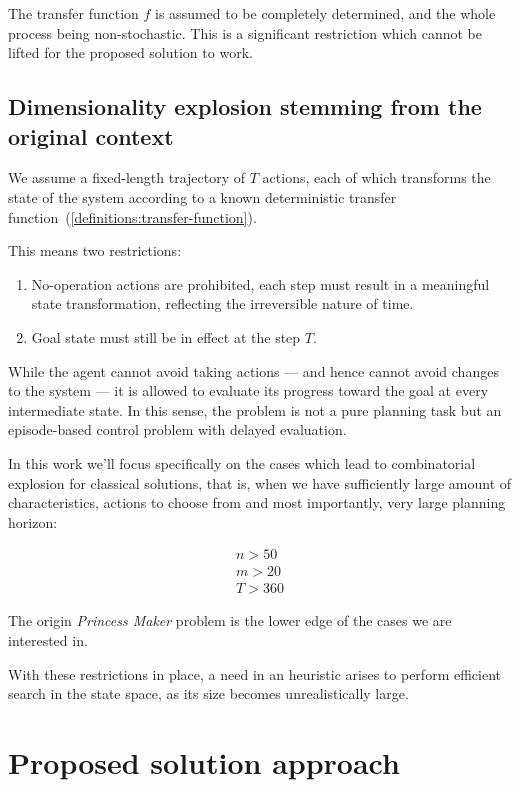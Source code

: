 \documentclass[12pt, a4paper]{article}
\begin{document}
	The transfer function $f$ is assumed to be completely determined, and the whole process being non-stochastic. This is a significant restriction which cannot be lifted for the proposed solution to work.

	\subsection{Dimensionality explosion stemming from the original context}

	We assume a fixed-length trajectory of $𝑇$ actions, each of which transforms the state of the system according to a known deterministic transfer function~(\ref{definitions:transfer-function}).

	This means two restrictions:
	
	\begin{enumerate}
		\item No-operation actions are prohibited, each step must result in a meaningful state transformation, reflecting the irreversible nature of time.
		\item Goal state must still be in effect at the step $T$.
	\end{enumerate}

	While the agent cannot avoid taking actions — and hence cannot avoid changes to the system — it is allowed to evaluate its progress toward the goal at every intermediate state.
	In this sense, the problem is not a pure planning task but an episode-based control problem with delayed evaluation.
	
	In this work we'll focus specifically on the cases which lead to combinatorial explosion for classical solutions, that is, when we have sufficiently large amount of characteristics, actions to choose from and most importantly, very large planning horizon:
	
	\begin{eqnarray}
		n > 50 \\
		m > 20 \\
		T > 360
	\end{eqnarray}
	
	The origin \textit{Princess Maker} problem is the lower edge of the cases we are interested in.

	With these restrictions in place, a need in an heuristic arises to perform efficient search in the state space, as its size becomes unrealistically large.
	
	\section{Proposed solution approach}\label{section::solution}
\end{document}
